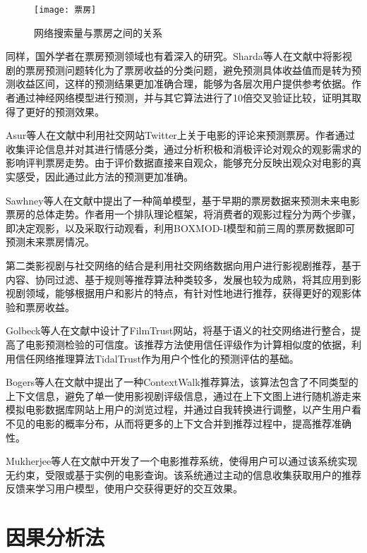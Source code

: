 \begin{figure}[h] 
  \centering
  \texttt{[image: 票房]}
  \caption{网络搜索量与票房之间的关系}
\end{figure}

同样，国外学者在票房预测领域也有着深入的研究。Sharda等人在文献\cite{sharda2006predicting}中将影视剧的票房预测问题转化为了票房收益的分类问题，避免预测具体收益值而是转为预测收益区间，这样的预测结果更加准确合理，能够为各层次用户提供参考依据。作者通过神经网络模型进行预测，并与其它算法进行了10倍交叉验证比较，证明其取得了更好的预测效果。

Asur等人在文献\cite{asur2010predicting}中利用社交网站Twitter上关于电影的评论来预测票房。作者通过收集评论信息并对其进行情感分类，通过分析积极和消极评论对观众的观影需求的影响评判票房走势。由于评价数据直接来自观众，能够充分反映出观众对电影的真实感受，因此通过此方法的预测更加准确。

Sawhney等人在文献\cite{sawhney1996parsimonious}中提出了一种简单模型，基于早期的票房数据来预测未来电影票房的总体走势。作者用一个排队理论框架，将消费者的观影过程分为两个步骤，即决定观影，以及采取行动观看，利用BOXMOD-I模型和前三周的票房数据即可预测未来票房情况。

第二类影视剧与社交网络的结合是利用社交网络数据向用户进行影视剧推荐，基于内容、协同过滤、基于规则等推荐算法种类较多，发展也较为成熟，将其应用到影视剧领域，能够根据用户和影片的特点，有针对性地进行推荐，获得更好的观影体验和票房收益。

Golbeck等人在文献\cite{golbeck2006filmtrust}中设计了FilmTrust网站，将基于语义的社交网络进行整合，提高了电影预测检验的可信度。该推荐方法使用信任评级作为计算相似度的依据，利用信任网络推理算法TidalTrust作为用户个性化的预测评估的基础。

Bogers等人在文献\cite{bogers2010movie}中提出了一种ContextWalk推荐算法，该算法包含了不同类型的上下文信息，避免了单一使用影视剧评级信息，通过在上下文图上进行随机游走来模拟电影数据库网站上用户的浏览过程，并通过自我转换进行调整，以产生用户看不见的电影的概率分布，从而将更多的上下文合并到推荐过程中，提高推荐准确性。

Mukherjee等人在文献\cite{mukherjee2003movie}中开发了一个电影推荐系统，使得用户可以通过该系统实现无约束，受限或基于实例的电影查询。该系统通过主动的信息收集获取用户的推荐反馈来学习用户模型，使用户交获得更好的交互效果。

\section{因果分析法}


